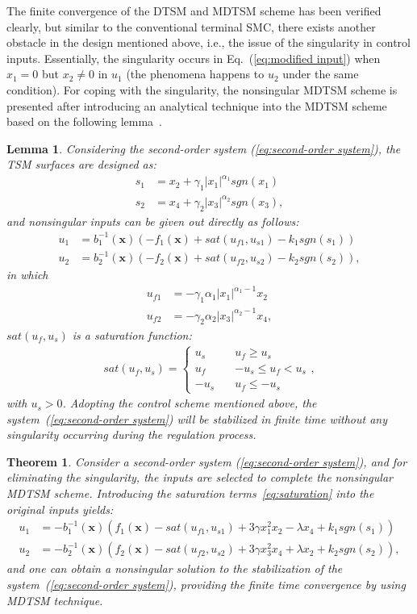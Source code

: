 \documentclass[3p]{elsarticle}
\theoremstyle{plain}
\newtheorem{mylem}{Lemma}
\newtheorem{mythm}{Theorem}
\theoremstyle{remark}
\begin{document}
The finite convergence of the DTSM and MDTSM scheme has been verified clearly, but similar to the conventional terminal SMC, there exists another obstacle in the design mentioned above, i.e., the issue of the singularity in control inputs. Essentially, the singularity occurs in Eq.~(\ref{eq:modified input}) when $x_1=0$ but $x_2\neq 0$ in $u_1$ (the phenomena happens to $u_2$ under the same condition). For coping with the singularity, the nonsingular MDTSM scheme is presented after introducing an analytical technique into the MDTSM scheme based on the following lemma~\cite{feng2013nonsingular}.
\begin{mylem}\label{lemma:3}
Considering the second-order system (\ref{eq:second-order system}), the TSM surfaces are designed as:
\begin{align*}
s_1 &= x_2+\gamma_1\vert x_1\vert^{\alpha_1}sgn(x_1)\\
s_2 &= x_4+\gamma_2\vert x_3\vert^{\alpha_2}sgn(x_3),
\end{align*}
and nonsingular inputs can be given out directly as follows:
\begin{align*}
u_1 &= b^{-1}_1(\bm x)(-f_1(\bm x)+sat(u_{f1},u_{s1})-k_1sgn(s_1))\\
u_2 &= b^{-1}_2(\bm x)(-f_2(\bm x)+sat(u_{f2},u_{s2})-k_2sgn(s_2)),
\end{align*}
in which
\begin{align*}
u_{f1}&=-\gamma_1\alpha_1\vert x_1\vert^{\alpha_1-1}x_2\\
u_{f2}&=-\gamma_2\alpha_2\vert x_3\vert^{\alpha_2-1}x_4,
\end{align*}
$sat(u_f,u_s)$ is a saturation function:
\begin{align}
sat(u_f,u_s)=
\begin{cases}
u_s\quad &u_f\ge u_s\\
u_f\quad &-u_s\le u_f< u_s\\
-u_s\quad &u_f\le -u_s\label{eq:saturation}
\end{cases},
\end{align}
with $u_s>0$. Adopting the control scheme mentioned above, the system~(\ref{eq:second-order system}) will be stabilized in finite time without any singularity occurring during the regulation process.
\end{mylem}
\begin{mythm}\label{theorem:3}
Consider a second-order system (\ref{eq:second-order system}), and for eliminating the singularity, the inputs are selected to complete the nonsingular MDTSM scheme. Introducing the saturation terms~\ref{eq:saturation} into the original inputs yields:
\begin{align}
u_1 &= -b_1^{-1}(\bm x)(f_1(\bm x)-sat(u_{f1},u_{s1})+3\gamma x_1^2x_2-\lambda x_4+k_1sgn(s_1))\\
u_2 &= -b_2^{-1}(\bm x)(f_2(\bm x)-sat(u_{f2},u_{s2})+3\gamma x_3^2x_4+\lambda x_2+k_2sgn(s_2)),\label{eq:nonsingular modified input}
\end{align}
and one can obtain a nonsingular solution to the stabilization of the system~(\ref{eq:second-order system}), providing the finite time convergence by using MDTSM technique.
\end{mythm}
\end{document}
